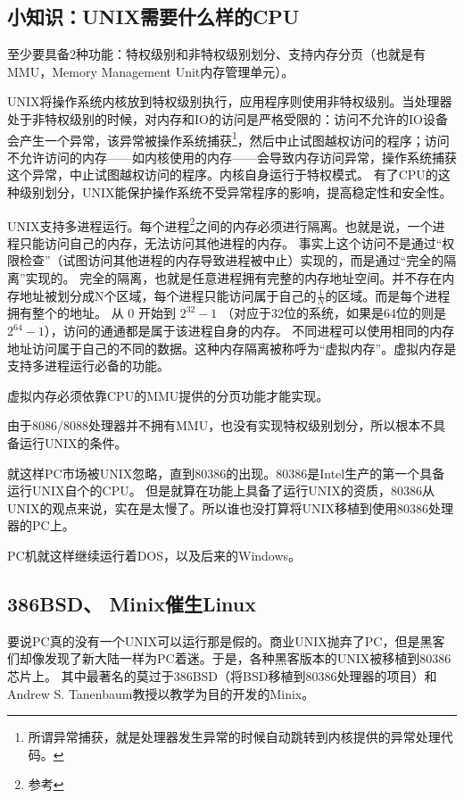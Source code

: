 \begin{insertnote}
\subsection*{小知识：UNIX需要什么样的CPU}
至少要具备2种功能：特权级别和非特权级别划分、支持内存分页（也就是有MMU，Memory Management Unit内存管理单元）。

UNIX将操作系统内核放到特权级别执行，应用程序则使用非特权级别。当处理器处于非特权级别的时候，对内存和IO的访问是严格受限的：访问不允许的IO设备会产生一个异常，该异常被操作系统捕获\footnote{所谓异常捕获，就是处理器发生异常的时候自动跳转到内核提供的异常处理代码。}，然后中止试图越权访问的程序；访问不允许访问的内存——如内核使用的内存——会导致内存访问异常，操作系统捕获这个异常，中止试图越权访问的程序。内核自身运行于特权模式。
有了CPU的这种级别划分，UNIX能保护操作系统不受异常程序的影响，提高稳定性和安全性。

UNIX支持多进程运行。每个进程\footnote{参考 }之间的内存必须进行隔离。也就是说，一个进程只能访问自己的内存，无法访问其他进程的内存。
事实上这个访问不是通过“权限检查”（试图访问其他进程的内存导致进程被中止）实现的，而是通过“完全的隔离”实现的。
完全的隔离，也就是任意进程拥有完整的内存地址空间。并不存在内存地址被划分成N个区域，每个进程只能访问属于自己的$ \frac{1}{N}$的区域。而是每个进程拥有整个的地址。
从 0 开始到 $2^{32}-1$ （对应于32位的系统，如果是64位的则是 $2^{64} - 1$），访问的通通都是属于该进程自身的内存。
不同进程可以使用相同的内存地址访问属于自己的不同的数据。这种内存隔离被称呼为“虚拟内存”。虚拟内存是支持多进程运行必备的功能。

虚拟内存必须依靠CPU的MMU提供的分页功能才能实现。
\end{insertnote}

由于8086/8088处理器并不拥有MMU，也没有实现特权级别划分，所以根本不具备运行UNIX的条件。

就这样PC市场被UNIX忽略，直到80386的出现。80386是Intel生产的第一个具备运行UNIX自个的CPU。
但是就算在功能上具备了运行UNIX的资质，80386从UNIX的观点来说，实在是太慢了。所以谁也没打算将UNIX移植到使用80386处理器的PC上。

PC机就这样继续运行着DOS，以及后来的Windows。

\subsection{386BSD、 Minix催生Linux}

要说PC真的没有一个UNIX可以运行那是假的。商业UNIX抛弃了PC，但是黑客们却像发现了新大陆一样为PC着迷。于是，各种黑客版本的UNIX被移植到80386芯片上。
其中最著名的莫过于386BSD（将BSD移植到80386处理器的项目）和Andrew S. Tanenbaum教授以教学为目的开发的Minix。

